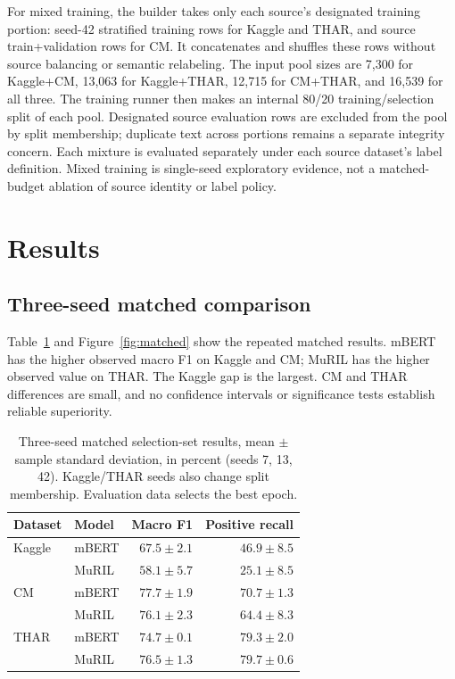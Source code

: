 \documentclass[11pt,a4paper]{article}
\begin{document}
For mixed training, the builder takes only each source's designated
training portion: seed-42 stratified training rows for Kaggle and THAR,
and source train+validation rows for CM. It concatenates and shuffles
these rows without source balancing or semantic relabeling. The input
pool sizes are 7,300 for Kaggle+CM, 13,063 for Kaggle+THAR, 12,715 for
CM+THAR, and 16,539 for all three. The training runner then makes an
internal 80/20 training/selection split of each pool. Designated source
evaluation rows are excluded from the pool by split membership; duplicate
text across portions remains a separate integrity concern. Each mixture
is evaluated separately under each source dataset's label definition.
Mixed training is single-seed exploratory evidence, not a matched-budget
ablation of source identity or label policy.

\section{Results}
\subsection{Three-seed matched comparison}
Table~\ref{tab:matched} and Figure~\ref{fig:matched} show the repeated
matched results. mBERT has the higher observed macro F1 on Kaggle and
CM; MuRIL has the higher observed value on THAR. The Kaggle gap is the
largest. CM and THAR differences are small, and no confidence intervals
or significance tests establish reliable superiority.

\begin{table}[htbp]
\centering\small
\begin{tabular}{llrr}
\toprule
Dataset & Model & Macro F1 & Positive recall\\
\midrule
Kaggle & mBERT & $67.5\pm2.1$ & $46.9\pm8.5$\\
       & MuRIL & $58.1\pm5.7$ & $25.1\pm8.5$\\
CM     & mBERT & $77.7\pm1.9$ & $70.7\pm1.3$\\
       & MuRIL & $76.1\pm2.3$ & $64.4\pm8.3$\\
THAR   & mBERT & $74.7\pm0.1$ & $79.3\pm2.0$\\
       & MuRIL & $76.5\pm1.3$ & $79.7\pm0.6$\\
\bottomrule
\end{tabular}
\caption{Three-seed matched selection-set results, mean $\pm$ sample
standard deviation, in percent (seeds 7, 13, 42). Kaggle/THAR seeds also
change split membership. Evaluation data selects the best epoch.}
\label{tab:matched}
\end{table}
\end{document}
